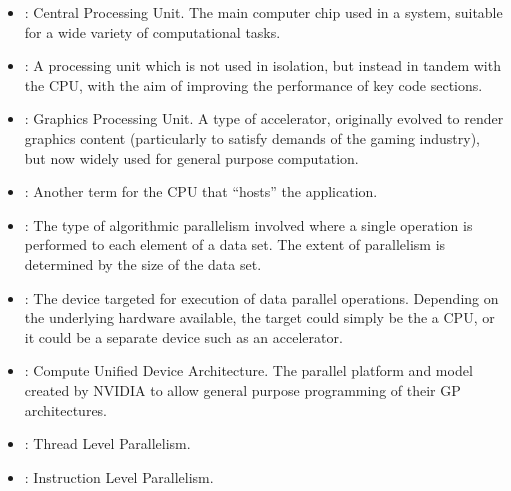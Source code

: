 \begin{itemize}

    \item {}: Central Processing Unit. The main computer chip used in a system, suitable for a wide variety of computational tasks.
    \item {}: A processing unit which is not used in isolation, but instead in tandem with the CPU, with the aim of improving the performance of key code sections. 
    \item {}: Graphics Processing Unit. A type of accelerator, originally evolved to render graphics content (particularly to satisfy demands of the gaming industry), but now widely used for general purpose computation.
    \item {}: Another term for the CPU that ``hosts'' the application.
    \item {}: The type of algorithmic parallelism involved where a single operation is performed to each element of a data set. The extent of parallelism is determined by the size of the data set.
    \item {}: The device targeted for execution of data parallel operations.  Depending on the underlying hardware available, the target could simply be the a CPU, or it could be a separate device such as an accelerator.
    \item {}: Compute Unified Device Architecture. The parallel platform and model created by NVIDIA to allow general purpose programming of their GP architectures.
    \item {}: Thread Level Parallelism.
    \item {}: Instruction Level Parallelism.
      
\end{itemize}





